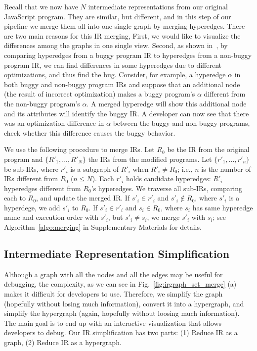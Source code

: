 \documentclass[runningheads]{llncs}
\begin{document}
Recall that we now have $N$ intermediate representations from our original JavaScript program. They are similar, but different, and in this step of our pipeline we merge them all into one single graph by merging hyperedges. There are two main reasons for this IR merging, First, we would like to visualize the differences among the graphs in one single view. Second, as shown in~\cite{DBLP:conf/vee/LimD21}, by comparing hyperedges from a buggy program IR to hyperedges from a non-buggy program IR, we can find differences in some hyperedges due to different optimizations, and thus find the bug. Consider, for example, a hyperedge $\alpha$ in both buggy and non-buggy program IRs and suppose that an additional node (the result of incorrect optimization) makes a buggy program's $\alpha$  different from the non-buggy program's $\alpha$.  
A merged hyperedge will show this additional node and its attributes will identify the buggy IR. 
A developer can now see that there was an optimization difference in $\alpha$ between the buggy and non-buggy programs, check whether this difference causes the buggy behavior.

We use the following procedure to merge IRs. Let $R_0$ be the IR from the original program and $\{R'_1,...,R'_N\}$ the IRs from the modified programs. Let $\{r'_1,...,r'_n\}$ be sub-IRs, where $r'_i$ is a subgraph of $R'_i$ when $R'_i\ne R_0$; i.e., $n$ is the number of IRs different from $R_0$ ($n \le N$). Each $r'_i$ holds candidate hyperedges: $R'_i$ hyperedges different from $R_0$'s hyperedges.  
We traverse all sub-IRs, comparing each to  $R_0$, and update the merged IR. 
If $s'_i \in r'_i$ and $s'_i \notin R_0$, where $s'_i$ is a hyperdege, we add $s'_i$ to $R_0$. If $s'_i \in r'_i$ and $s_i \in R_0$, where $s_i$ has same hyperedge name and execution order with $s'_i$, but $s'_i \ne s_i$, we merge $s'_i$ with $s_i$; see Algorithm~\ref{algo:merging} in Supplementary Materials for details.
%
\subsection{Intermediate Representation Simplification}\label{sec:graph_simplify}

Although a graph with all the nodes and all the edges may be useful for debugging, the complexity, as we can see in Fig.~\ref{fig:irgraph_set_merge} (a) makes it difficult for developers to use. Therefore, we simplify the graph (hopefully without losing much information), convert it into a hypergraph, and simplify the hypergraph (again, hopefully without loosing much information). The main goal is to end up with an interactive visualization that allows developers to debug. Our IR simplification has two parts: (1) Reduce IR as a graph, (2) Reduce IR as a hypergraph.
\end{document}

